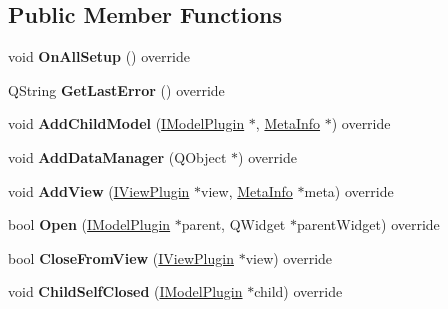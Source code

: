 \subsection*{Public Member Functions}
\begin{DoxyCompactItemize}
\item 
void {\bfseries On\+All\+Setup} () override\hypertarget{class_task_sketch_model_af1c56b3d144468266b5c82297b83852f}{}\label{class_task_sketch_model_af1c56b3d144468266b5c82297b83852f}

\item 
Q\+String {\bfseries Get\+Last\+Error} () override\hypertarget{class_task_sketch_model_a683fcebcaa91cce32a9dbdde28ea249f}{}\label{class_task_sketch_model_a683fcebcaa91cce32a9dbdde28ea249f}

\item 
void {\bfseries Add\+Child\+Model} (\hyperlink{class_i_model_plugin}{I\+Model\+Plugin} $\ast$, \hyperlink{struct_meta_info}{Meta\+Info} $\ast$) override\hypertarget{class_task_sketch_model_a3a87e79c34a0e67bf1027fffedb43bc4}{}\label{class_task_sketch_model_a3a87e79c34a0e67bf1027fffedb43bc4}

\item 
void {\bfseries Add\+Data\+Manager} (Q\+Object $\ast$) override\hypertarget{class_task_sketch_model_aa5239531a2b064abdb3c06efbe544c38}{}\label{class_task_sketch_model_aa5239531a2b064abdb3c06efbe544c38}

\item 
void {\bfseries Add\+View} (\hyperlink{class_i_view_plugin}{I\+View\+Plugin} $\ast$view, \hyperlink{struct_meta_info}{Meta\+Info} $\ast$meta) override\hypertarget{class_task_sketch_model_a7febb27374b155e86d33543adc350c36}{}\label{class_task_sketch_model_a7febb27374b155e86d33543adc350c36}

\item 
bool {\bfseries Open} (\hyperlink{class_i_model_plugin}{I\+Model\+Plugin} $\ast$parent, Q\+Widget $\ast$parent\+Widget) override\hypertarget{class_task_sketch_model_ace37e6001318e699bdd1a1412628ea90}{}\label{class_task_sketch_model_ace37e6001318e699bdd1a1412628ea90}

\item 
bool {\bfseries Close\+From\+View} (\hyperlink{class_i_view_plugin}{I\+View\+Plugin} $\ast$view) override\hypertarget{class_task_sketch_model_a32efbd8dbe71476b9ea223f330ff6cc8}{}\label{class_task_sketch_model_a32efbd8dbe71476b9ea223f330ff6cc8}

\item 
void {\bfseries Child\+Self\+Closed} (\hyperlink{class_i_model_plugin}{I\+Model\+Plugin} $\ast$child) override\hypertarget{class_task_sketch_model_ab64b7d0896769163fb7cb5c786c67efe}{}\label{class_task_sketch_model_ab64b7d0896769163fb7cb5c786c67efe}


\end{DoxyCompactItemize}
